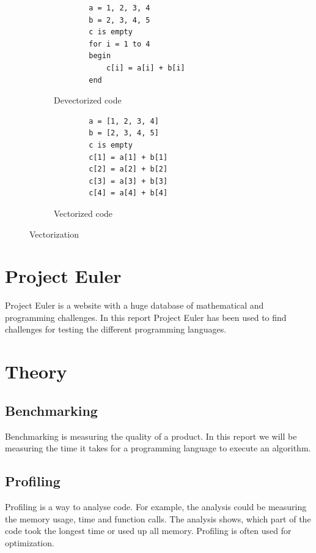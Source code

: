 \documentclass[a4paper, 11pt, titlepage]{article}
\begin{document}
\begin{figure}[H]
	\centering
	\begin{subfigure}[b]{0.7\textwidth}
		\centering
		\begin{lstlisting}
		a = 1, 2, 3, 4
		b = 2, 3, 4, 5
		c is empty
		for i = 1 to 4
		begin
			c[i] = a[i] + b[i]
		end
		\end{lstlisting}
		\caption{Devectorized code}
	\end{subfigure}
	\begin{subfigure}[b]{0.7\textwidth}
		\centering
		\begin{lstlisting}
		a = [1, 2, 3, 4]
		b = [2, 3, 4, 5]
		c is empty
		c[1] = a[1] + b[1]
		c[2] = a[2] + b[2]
		c[3] = a[3] + b[3]
		c[4] = a[4] + b[4]
		\end{lstlisting}
		\caption{Vectorized code}
	\end{subfigure}	
	\caption{Vectorization}
	\label{vec}
\end{figure}

\section{Project Euler}
Project Euler is a website with a huge database of mathematical and programming challenges. In this report Project Euler has been used to find challenges for testing the different programming languages.

\section{Theory}
\subsection{Benchmarking}
Benchmarking is measuring the quality of a product. In this report we will be measuring the time it takes for a programming language to execute an algorithm.

\subsection{Profiling}
Profiling is a way to analyse code. For example, the analysis could be measuring the memory usage, time and function calls. The analysis shows, which part of the code took the longest time or used up all memory. Profiling is often used for optimization.
\end{document}
